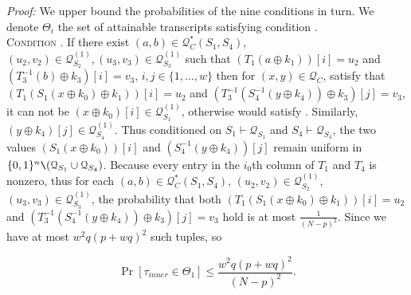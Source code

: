 \noindent \emph{Proof:} We upper bound the probabilities of the nine conditions in turn. We denote $\Theta_i$ the set of attainable transcripts satisfying condition \ci.\\

\noindent \textsc{Condition \cone}. If there exist $(a, b) \in \mathcal{Q}_{C}^{*}\left(S_{1}, S_{4}\right)$, $(u_{2}, v_{2}) \in \mathcal{Q}_{S_{2}}^{(1)}, (u_{3}, v_{3}) \in \mathcal{Q}_{S_{3}}^{(1)}$ such that $\left(T_1\left(a \oplus k_{1}\right)\right)[i] = u_2$ and $\left(T_{3}^{-1}\left(b\right) \oplus k_{3}\right)[i] = v_3$, $i, j \in\{1, \ldots, w\}$ then for $(x, y) \in \mathcal{Q}_{C}$, satisfy that $\left(T_{1}\left(S_{1}\left(x \oplus k_{0}\right) \oplus k_{1}\right)\right)[i]=u_2$ and $\left(T_{3}^{-1}\left(S_{4}^{-1}\left(y \oplus k_{4}\right)\right) \oplus k_{3}\right)[j]=v_3$, it can not be $\left(x \oplus k_{0}\right)[i] \in \mathcal{Q}_{S_{1}}^{(1)}$, otherwise would satisfy \btwo. Similarly, $\left(y \oplus k_{4}\right)[j] \in \mathcal{Q}_{S_{4}}^{(1)}$. Thus conditioned on $S_{1} \vdash \mathcal{Q}_{S_{1}}$ and $S_{4} \vdash \mathcal{Q}_{S_{4}}$, the two values $\left(S_{1}\left(x \oplus k_{0}\right)\right)[i]$ and $\left(S_{4}^{-1}\left(y \oplus k_{4}\right)\right)[j]$  remain uniform in $\{0, 1\}^{n} \verb|\| (\mathcal{Q}_{S_{1}} \cup \mathcal{Q}_{S_{4}})$. Because every entry in the $i_{0}$th column of $T_{1}$ and $T_{4}$ is nonzero, thus for each $(a, b) \in \mathcal{Q}_{C}^{*}\left(S_{1}, S_{4}\right)$, $(u_{2}, v_{2}) \in \mathcal{Q}_{S_{2}}^{(1)}$, $(u_{3}, v_{3}) \in \mathcal{Q}_{S_{3}}^{(1)}$, the probability that both $\left(T_{1}\left(S_{1}\left(x \oplus k_{0}\right) \oplus k_{1}\right)\right)[i]=u_2$ and $\left(T_{3}^{-1}\left(S_{4}^{-1}\left(y \oplus k_{4}\right)\right) \oplus k_{3}\right)[j]=v_3$ hold is at most $\frac{1}{(N-p)^{2}}$. Since we have at most $w^{2} q (p+w q)^{2}$ such tuples, so

$$
\operatorname{Pr}\left[\tau_{inner} \in \Theta_{1}\right] \leq \frac{w^{2} q (p+w q)^{2}}{(N-p)^{2}}.
$$

